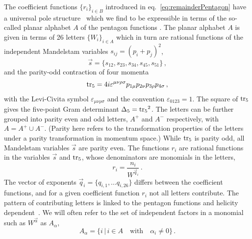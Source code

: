 The coefficient functions $\{r_i\}_{i\in B}$ introduced in 
eq.~\eqref{eq:remainderPentagon}  have a universal pole 
structure~\cite{Abreu:2018zmy} which we find to be expressible in terms of
the so-called planar alphabet $A$ of the pentagon functions \cite{Gehrmann:2018yef}.
The planar alphabet $A$ is given in terms
of 26 letters $\{W_i\}_{i\in A}$ which in turn are rational functions of the independent 
Mandelstam variables $s_{ij}=(p_{i}+p_j)^2$, 
\begin{equation}\label{eq:mandelstams}
\vec s=\{s_{12},s_{23},s_{34},s_{45},s_{51}\}\,,
\end{equation}
and the parity-odd contraction of four 
momenta 
\begin{equation}\label{eq:tr5Def}
\operatorname{tr_5}= 4 i \varepsilon^{\mu\nu\rho\sigma}
p_{1\mu} p_{2\nu} p_{3\rho} p_{4\sigma}\, ,
\end{equation}
with the Levi-Civita symbol $\varepsilon_{\mu\nu\rho\sigma}$ and the convention $\varepsilon_{0123}=1$. 
The square of $\operatorname{tr_5}$ gives the 
five-point Gram determinant $\Delta_5=\operatorname{tr_5}^2$.
The letters can be further grouped into parity even and odd letters, 
$A^+$ and $A^-$ respectively, with $A=A^+\cup A^-$. (Parity here refers to  
the transformation properties of the letters under a parity transformation in 
momentum space.)
While $\operatorname{tr_5}$ is parity odd, all Mandelstam variables $\vec s$ are parity even. 
The functions $r_i$ are rational functions in the variables ${\vec s}$ and $\operatorname{tr_5}$,  
whose denominators are monomials in the letters,
\begin{equation}
    r_i = \frac{n_{i}}{ W^{\vec q_i}}\,.
    \label{eq:letterDecomposition}
\end{equation}
The vector of exponents $\vec q_i=\{q_{i,1}, ... q_{i,26}\}$ 
differs between the coefficient functions, and for a given
coefficient function $r_i$ not all letters contribute. The pattern of
contributing letters is linked to the pentagon functions and helicity
dependent~\cite{Abreu:2018zmy}. 
We will often refer to the set of 
independent factors in a monomial such as $W^{\vec\alpha}$ as $A_\alpha$,
\begin{equation}\label{eq:A_alp}
		A_\alpha = \{ i\,|\, i \in A \quad \mbox{with} \quad \alpha_i\neq 0 \} \,.
\end{equation}

